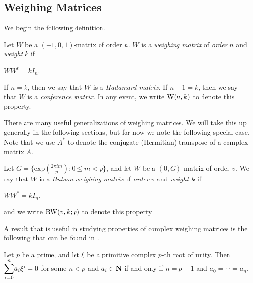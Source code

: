 \documentclass[../../../main]{subfiles}
\begin{document}

\subsection{Weighing Matrices}

We begin the following definition.

\begin{defin}\label{weighing matrix}
  Let $W$ be a $(-1,0,1)$-matrix of order $n$. $W$ is a {\it weighing matrix} of {\it order} $n$ and {\it weight} $k$ if
  \begin{defenum}
  \item $WW^t = kI_n$.
  \end{defenum}
  If $n=k$, then we say that $W$ is a {\it Hadamard matrix}. If $n-1=k$, then we say that $W$ is a {\it conference matrix}. In any event, we write $\text{W}(n,k)$ to denote this property.
\end{defin}

There are many useful generalizations of weighing matrices. We will take this up
generally in the following sections, but for now we note the following special
case. Note that we use $A^*$ to denote the conjugate (Hermitian) transpose of a complex matrix $A$.

\begin{defin}\label{butson-unitary}
  Let $G = \{\mathrm{exp}(\frac{2\pi im}{p}) : 0 \leq m < p\}$, and let $W$ be a $(0,G)$-matrix of order $v$. We say that $W$ is a {\it Butson weighing matrix} of {\it order} $v$ and {\it weight} $k$ if
  \begin{defenum}
  \item $WW^* = kI_n$,
  \end{defenum}
  and we write $\text{BW}(v,k;p)$ to denote this property.
\end{defin}

A result that is useful in studying properties of complex weighing matrices is
the following that can be found in \cite{lam-leung}.

\begin{lem}\label{butson lemma}
  Let $p$ be a prime, and let $\xi$ be a primitive complex $p$-th root of unity. Then $\ssum_{i=0}^n a_i\xi^i = 0$ for some $n < p$ and $a_i \in \mathbf{N}$ if and only if $n = p-1$ and $a_0 = \cdots = a_n$.
\end{lem}
\end{document}

